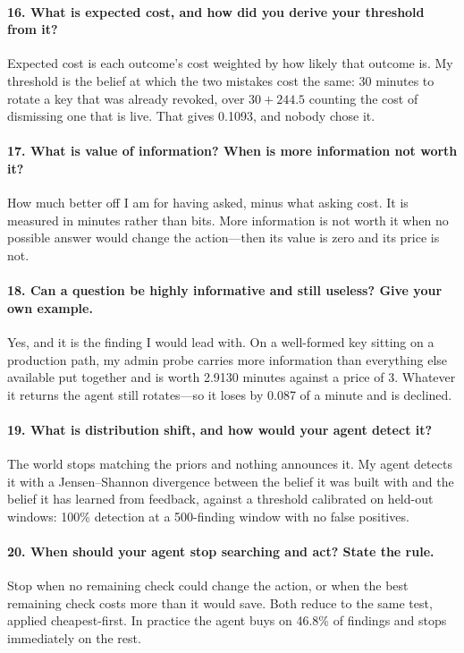 \documentclass{article}
\begin{document}
\paragraph{16. What is expected cost, and how did you derive your threshold from it?}
Expected cost is each outcome's cost weighted by how likely that outcome is. My
threshold is the belief at which the two mistakes cost the same: 30 minutes to
rotate a key that was already revoked, over $30 + 244.5$ counting the cost of
dismissing one that is live. That gives 0.1093, and nobody chose it.

\paragraph{17. What is value of information? When is more information not worth it?}
How much better off I am for having asked, minus what asking cost. It is measured
in minutes rather than bits. More information is not worth it when no possible
answer would change the action---then its value is zero and its price is not.

\paragraph{18. Can a question be highly informative and still useless? Give your own example.}
Yes, and it is the finding I would lead with. On a well-formed key sitting on a
production path, my admin probe carries more information than everything else
available put together and is worth 2.9130 minutes against a price of 3. Whatever
it returns the agent still rotates---so it loses by 0.087 of a minute and is
declined.

\paragraph{19. What is distribution shift, and how would your agent detect it?}
The world stops matching the priors and nothing announces it. My agent detects it
with a Jensen--Shannon divergence between the belief it was built with and the
belief it has learned from feedback, against a threshold calibrated on held-out
windows: 100\% detection at a 500-finding window with no false positives.

\paragraph{20. When should your agent stop searching and act? State the rule.}
Stop when no remaining check could change the action, or when the best remaining
check costs more than it would save. Both reduce to the same test, applied
cheapest-first. In practice the agent buys on 46.8\% of findings and stops
immediately on the rest.
\end{document}
